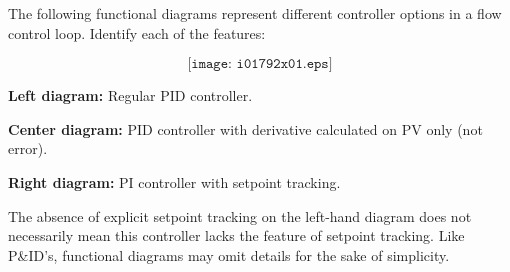

The following functional diagrams represent different controller options in a flow control loop.  Identify each of the features:

$$\texttt{[image: i01792x01.eps]}$$







{\bf Left diagram:} Regular PID controller.

\vskip 10pt

{\bf Center diagram:} PID controller with derivative calculated on PV only (not error).

\vskip 10pt

{\bf Right diagram:} PI controller with setpoint tracking.







The absence of explicit setpoint tracking on the left-hand diagram does not necessarily mean this controller lacks the feature of setpoint tracking.  Like P\&ID's, functional diagrams may omit details for the sake of simplicity.




